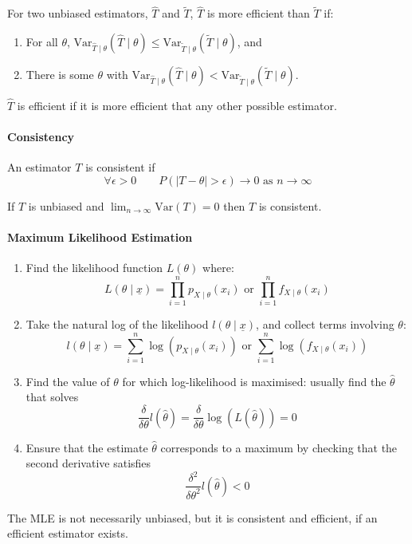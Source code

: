 \documentclass[twocolumn,english]{article}
\begin{document}
For two unbiased estimators, $\hat{T}$ and $\tilde{T}$, $\hat{T}$
is more efficient than $\tilde{T}$ if:
\begin{enumerate}
\item For all $\theta$, $\text{Var}_{\hat{T}\mid\theta}\left(\hat{T}\mid\theta\right)\leq\text{Var}_{\tilde{T}\mid\theta}\left(\tilde{T}\mid\theta\right)$,
and
\item There is some $\theta$ with $\text{Var}_{\hat{T}\mid\theta}\left(\hat{T}\mid\theta\right)<\text{Var}_{\tilde{T}\mid\theta}\left(\tilde{T}\mid\theta\right)$.
\end{enumerate}
$\hat{T}$ is efficient if it is more efficient that any other possible
estimator.

\paragraph{Consistency}

An estimator $T$ is consistent if
\[
\forall\epsilon>0\qquad P\left(\left|T-\theta\right|>\epsilon\right)\rightarrow0\text{ as }n\rightarrow\infty
\]

If $T$ is unbiased and $\lim_{n\rightarrow\infty}\text{Var}\left(T\right)=0$
then $T$ is consistent.

\paragraph{Maximum Likelihood Estimation}
\begin{enumerate}
\item Find the likelihood function $L\left(\theta\right)$ where:
\[
L\left(\theta\mid\underline{x}\right)=\prod_{i=1}^{n}p_{X\mid\theta}\left(x_{i}\right)\text{ or }\prod_{i=1}^{n}f_{X\mid\theta}\left(x_{i}\right)
\]
\item Take the natural log of the likelihood $l\left(\theta\mid\underline{x}\right)$,
and collect terms involving $\theta$:
\[
l\left(\theta\mid\underline{x}\right)=\sum_{i=1}^{n}\log\left(p_{X\mid\theta}\left(x_{i}\right)\right)\text{ or }\sum_{i=1}^{n}\log\left(f_{X\mid\theta}\left(x_{i}\right)\right)
\]
\item Find the value of $\theta$ for which log-likelihood is maximised:
usually find the $\hat{\theta}$ that solves
\[
\frac{\delta}{\delta\theta}l\left(\hat{\theta}\right)=\frac{\delta}{\delta\theta}\log\left(L\left(\hat{\theta}\right)\right)=0
\]
\item Ensure that the estimate $\hat{\theta}$ corresponds to a maximum
by checking that the second derivative satisfies
\[
\frac{\delta^{2}}{\delta\theta^{2}}l\left(\hat{\theta}\right)<0
\]
\end{enumerate}
The MLE is not necessarily unbiased, but it is consistent and efficient,
if an efficient estimator exists.
\end{document}
